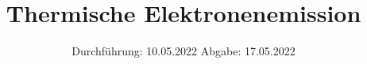 

\subject{V504}
\title{Thermische Elektronenemission}
\date{%
  Durchführung: 10.05.2022
  \hspace{3em}
  Abgabe: 17.05.2022
}



\maketitle
\thispagestyle{empty}
\tableofcontents
\newpage






\printbibliography{}

%


